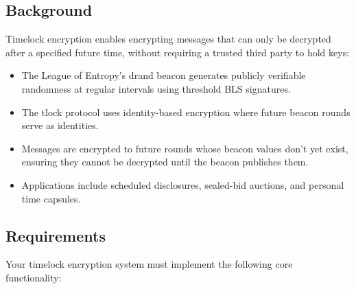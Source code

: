 \documentclass[10pt,a4paper,american]{exam}
\begin{document}
\subsection*{Background}
Timelock encryption enables encrypting messages that can only be decrypted after a specified future time, without requiring a trusted third party to hold keys:
\begin{itemize}
	\item The League of Entropy's drand beacon generates publicly verifiable randomness at regular intervals using threshold BLS signatures.
	\item The tlock protocol uses identity-based encryption where future beacon rounds serve as identities.
	\item Messages are encrypted to future rounds whose beacon values don't yet exist, ensuring they cannot be decrypted until the beacon publishes them.
	\item Applications include scheduled disclosures, sealed-bid auctions, and personal time capsules.
\end{itemize}

\subsection*{Requirements}
Your timelock encryption system must implement the following core functionality:
\end{document}
